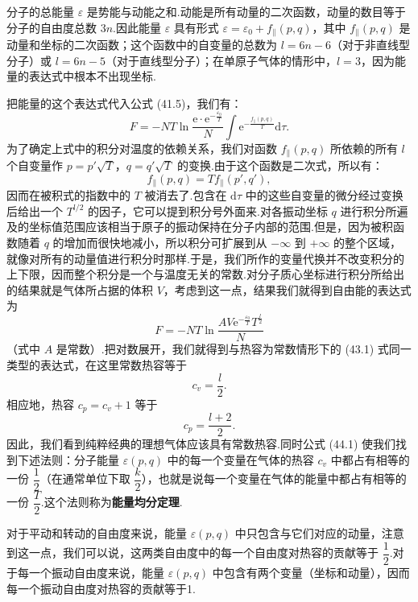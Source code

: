 分子的总能量 $\varepsilon$ 是势能与动能之和.动能是所有动量的二次函数，动量的数目等于分子的自由度总数 $3n$.因此能量 $\varepsilon$ 具有形式 $\varepsilon=\varepsilon_0+f_{\parallel}(p,q)$，其中 $f_{\parallel}(p,q)$ 是动量和坐标的二次函数；这个函数中的自变量的总数为 $l=6n-6$（对于非直线型分子）或 $l=6n-5$（对于直线型分子）；在单原子气体的情形中，$l=3$，因为能量的表达式中根本不出现坐标.

把能量的这个表达式代入公式 (41.5)，我们有：
\begin{equation*}
  F=-NT\ln\frac{\mathrm{e}\cdot\mathrm{e}^{-\frac{\varepsilon_0}{T}}}{N}
  \int\mathrm{e}^{-\frac{f_{\parallel}(p,q)}{T}}\mathrm{d}\tau.
\end{equation*}
为了确定上式中的积分对温度的依赖关系，我们对函数 $f_{\parallel}(p,q)$ 所依赖的所有 $l$ 个自变量作 $p=p'\sqrt{T}$，$q=q'\sqrt{T}$ 的变换.由于这个函数是二次式，所以有：
\begin{equation*}
  f_{\parallel}(p,q)=Tf_{\parallel}(p',q'),
\end{equation*}
因而在被积式的指数中的 $T$ 被消去了.包含在 $\mathrm{d}\tau$ 中的这些自变量的微分经过变换后给出一个 $T^{l/2}$ 的因子，它可以提到积分号外面来.对各振动坐标 $q$ 进行积分所遍及的坐标值范围应该相当于原子的振动保持在分子内部的范围.但是，因为被积函数随着 $q$ 的增加而很快地减小，所以积分可扩展到从 $-\infty$ 到 $+\infty$ 的整个区域，就像对所有的动量值进行积分时那样.于是，我们所作的变量代换并不改变积分的上下限，因而整个积分是一个与温度无关的常数.对分子质心坐标进行积分所给出的结果就是气体所占据的体积 $V$，考虑到这一点，结果我们就得到自由能的表达式为
\begin{equation*}
  F=-NT\ln\frac{AV\mathrm{e}^{-\frac{\varepsilon_0}{T}}T^{\frac{l}{2}}}{N}
\end{equation*}
（式中 $A$ 是常数）.把对数展开，我们就得到与热容为常数情形下的 (43.1) 式同一类型的表达式，在这里常数热容等于
\begin{equation}
  c_v=\frac{l}{2}.
\end{equation}
相应地，热容 $c_p=c_v+1$ 等于
\begin{equation}
  c_p=\frac{l+2}{2}.
\end{equation}
因此，我们看到纯粹经典的理想气体应该具有常数热容.同时公式 (44.1) 使我们找到下述法则：分子能量 $\varepsilon(p,q)$ 中的每一个变量在气体的热容 $c_v$ 中都占有相等的一份 $\dfrac{1}{2}$（在通常单位下取 $\dfrac{k}{2}$），也就是说每一个变量在气体的能量中都占有相等的一份 $\dfrac{T}{2}$.这个法则称为\textbf{能量均分定理}.

对于平动和转动的自由度来说，能量 $\varepsilon(p,q)$ 中只包含与它们对应的动量，注意到这一点，我们可以说，这两类自由度中的每一个自由度对热容的贡献等于 $\dfrac{1}{2}$.对于每一个振动自由度来说，能量 $\varepsilon(p,q)$ 中包含有两个变量（坐标和动量），因而每一个振动自由度对热容的贡献等于1.


